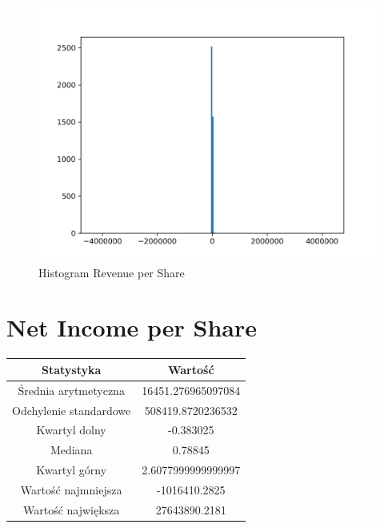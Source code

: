 \documentclass{article}
\begin{document}
\begin{figure}[h!]
    \includegraphics[width=\linewidth]{variables/Revenue per Share.png}
    \caption{Histogram Revenue per Share }
\end{figure}\section{ Net Income per Share }

\begin{center}
    \begin{tabular}{|c | c|} 
    \hline
    Statystyka & Wartość \\
    \hline\hline
    Średnia arytmetyczna & 16451.276965097084 \\ 
    \hline
    Odchylenie standardowe & 508419.8720236532 \\
    \hline
    Kwartyl dolny & -0.383025 \\
    \hline
    Mediana & 0.78845 \\
    \hline
    Kwartyl górny & 2.6077999999999997 \\
    \hline
    Wartość najmniejsza & -1016410.2825 \\
    \hline
    Wartość największa & 27643890.2181 \\
    \hline
   \end{tabular}
\end{center}
\end{document}
